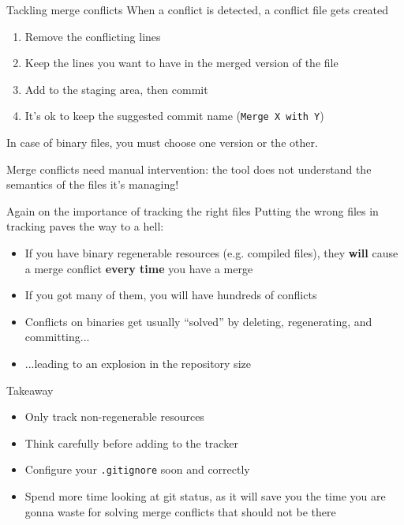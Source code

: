 \documentclass[presentation]{beamer}
\begin{document}
\begin{frame}{Tackling merge conflicts}
    When a conflict is detected, a conflict file gets created
    \begin{enumerate}
        \item Remove the conflicting lines
        \item Keep the lines you want to have in the merged version of the file
        \item Add to the staging area, then commit
        \item It's ok to keep the suggested commit name (\texttt{Merge X with Y})
    \end{enumerate}
    In case of binary files, you must choose one version or the other.

    Merge conflicts need manual intervention: the tool does not understand the semantics of the files it's managing!
\end{frame}

\begin{frame}[fragile]{Again on the importance of tracking the right files}
    Putting the wrong files in tracking paves the way to a hell:
    \begin{itemize}
        \item If you have binary regenerable resources (e.g. compiled files), they \textbf{will} cause a merge conflict \textbf{every time} you have a merge
        \item If you got many of them, you will have hundreds of conflicts
        \item Conflicts on binaries get usually ``solved'' by deleting, regenerating, and committing...
        \item ...leading to an explosion in the repository size
    \end{itemize}
    \begin{block}{Takeaway}
        \begin{itemize}
            \item Only track non-regenerable resources
            \item Think carefully before adding to the tracker
            \item Configure your \texttt{.gitignore} soon and correctly
            \item Spend more time looking at git status, as it will save you the time you are gonna waste for solving merge conflicts that should not be there
        \end{itemize}
    \end{block}
\end{frame}
\end{document}
